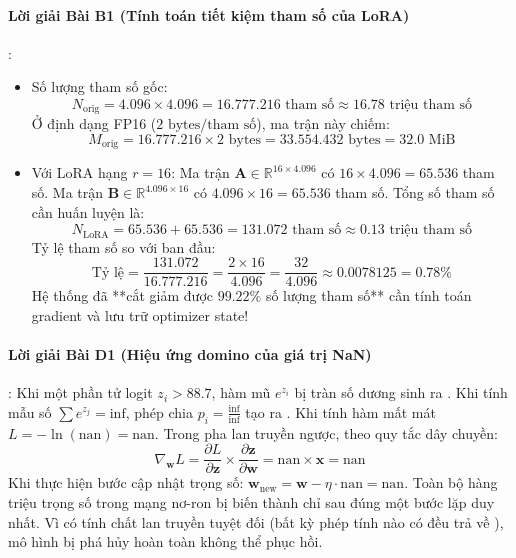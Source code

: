 \paragraph{Lời giải Bài B1 (Tính toán tiết kiệm tham số của LoRA)}:
\begin{itemize}
  \item[a)] Số lượng tham số gốc:
  \begin{equation*}
  N_{\text{orig}} = 4.096 \times 4.096 = 16.777.216\text{ tham số} \approx 16.78\text{ triệu tham số}
  \end{equation*}
  Ở định dạng FP16 ($2\text{ bytes/tham số}$), ma trận này chiếm:
  \begin{equation*}
  M_{\text{orig}} = 16.777.216 \times 2\text{ bytes} = 33.554.432\text{ bytes} = 32.0\text{ MiB}
  \end{equation*}
  \item[b)] Với LoRA hạng $r = 16$:
  Ma trận $\mathbf{A} \in \mathbb{R}^{16 \times 4.096}$ có $16 \times 4.096 = 65.536$ tham số.
  Ma trận $\mathbf{B} \in \mathbb{R}^{4.096 \times 16}$ có $4.096 \times 16 = 65.536$ tham số.
  Tổng số tham số cần huấn luyện là:
  \begin{equation*}
  N_{\text{LoRA}} = 65.536 + 65.536 = 131.072\text{ tham số} \approx 0.13\text{ triệu tham số}
  \end{equation*}
  Tỷ lệ tham số so với ban đầu:
  \begin{equation*}
  \text{Tỷ lệ} = \frac{131.072}{16.777.216} = \frac{2 \times 16}{4.096} = \frac{32}{4.096} \approx 0.0078125 = 0.78\%
  \end{equation*}
  Hệ thống đã **cắt giảm được $99.22\%$ số lượng tham số** cần tính toán gradient và lưu trữ optimizer state!
\end{itemize}

\paragraph{Lời giải Bài D1 (Hiệu ứng domino của giá trị NaN)}:
Khi một phần tử logit $z_i > 88.7$, hàm mũ $e^{z_i}$ bị tràn số dương sinh ra . Khi tính mẫu số $\sum e^{z_j} = \text{inf}$, phép chia $p_i = \frac{\text{inf}}{\text{inf}}$ tạo ra . 
Khi tính hàm mất mát $L = -\ln(\text{nan}) = \text{nan}$. Trong pha lan truyền ngược, theo quy tắc dây chuyền:
\begin{equation*}
\nabla_\mathbf{w} L = \frac{\partial L}{\partial \mathbf{z}} \times \frac{\partial \mathbf{z}}{\partial \mathbf{w}} = \text{nan} \times \mathbf{x} = \text{nan}
\end{equation*}
Khi thực hiện bước cập nhật trọng số: $\mathbf{w}_{\text{new}} = \mathbf{w} - \eta \cdot \text{nan} = \text{nan}$. Toàn bộ hàng triệu trọng số trong mạng nơ-ron bị biến thành  chỉ sau đúng một bước lặp duy nhất. Vì  có tính chất lan truyền tuyệt đối (bất kỳ phép tính nào có  đều trả về ), mô hình bị phá hủy hoàn toàn không thể phục hồi.
